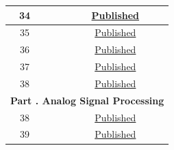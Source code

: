 \begin{longtable}[c]{|c|m{12cm}|c|}
34	&	\nameref*{mod:twai}	&	\hyperref[mod:twai]{Published}	\\\hline
35	&	\nameref*{mod:ledpwm}	&	\hyperref[mod:ledpwm]{Published}	\\\hline
36	&	\nameref*{mod:mcpwm}	&	\hyperref[mod:mcpwm]{Published}	\\\hline
37	&	\nameref*{mod:rmt}	&	\hyperref[mod:rmt]{Published}	\\\hline
38	&	\nameref*{mod:parlio}	&	\hyperref[mod:parlio]{Published}	\\\hline
\multicolumn{3}{|c|}{\textbf{Part \uppercase\expandafter{\romannumeral6}. Analog Signal Processing}}	\\\hline
38	&	\nameref*{mod:tmpsen}	&	\hyperref[mod:tmpsen]{Published}	\\\hline
39	&	\nameref*{mod:adc}	&	\hyperref[mod:adc]{Published}	\\\hline
\end{longtable}


